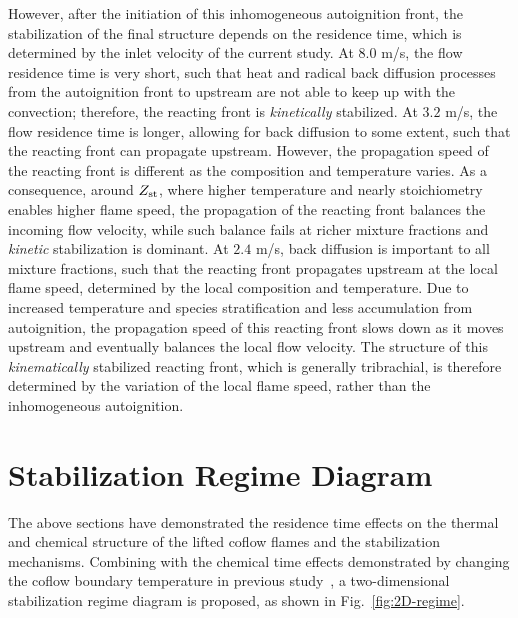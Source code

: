 \documentclass{wssci}
\begin{document}
However, after the initiation of this inhomogeneous autoignition front, the stabilization of the final structure depends on the residence time, which is determined by the inlet velocity of the current study.  At $8.0$ m/s, the flow residence time is very short, such that heat and radical back diffusion processes from the autoignition front to upstream are not able to keep up with the convection; therefore, the reacting front is \emph{kinetically} stabilized.  At $3.2$ m/s, the flow residence time is longer, allowing for back diffusion to some extent, such that the reacting front can propagate upstream.  However, the propagation speed of the reacting front is different as the composition and temperature varies.  As a consequence, around $Z_{\rm st}$, where higher temperature and nearly stoichiometry enables higher flame speed, the propagation of the reacting front balances the incoming flow velocity, while such balance fails at richer mixture fractions and \emph{kinetic} stabilization is dominant.  At $2.4$ m/s, back diffusion is important to all mixture fractions, such that the reacting front propagates upstream at the local flame speed, determined by the local composition and temperature.  Due to increased temperature and species stratification and less accumulation from autoignition, the propagation speed of this reacting front slows down as it moves upstream and eventually balances the local flow velocity.  The structure of this \emph{kinematically} stabilized reacting front, which is generally tribrachial, is therefore determined by the variation of the local flame speed, rather than the inhomogeneous autoignition.      


        
\section{Stabilization Regime Diagram}

The above sections have demonstrated the residence time effects on the thermal and chemical structure of the lifted coflow flames and the stabilization mechanisms.  Combining with the chemical time effects demonstrated by changing the coflow boundary temperature in previous study~\cite{deng15}, a two-dimensional stabilization regime diagram is proposed, as shown in Fig.~\ref{fig:2D-regime}.  
\end{document}
